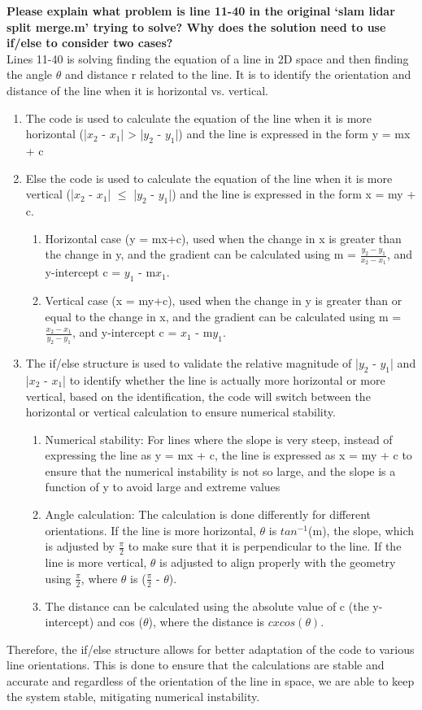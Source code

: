 \textbf{Please explain what problem is line 11-40 in the original ‘slam lidar split merge.m’ trying to solve? Why does the solution need to use if/else to consider two cases?}\\
Lines 11-40 is solving finding the equation of a line in 2D space and then finding the angle $\theta$ and distance r related to the line. It is to identify the orientation and distance of the line when it is horizontal vs. vertical. 
\begin{enumerate}
    \item The code is used to calculate the equation of the line when it is more horizontal (|$x_2$ - $x_1$| > |$y_2$ - $y_1$|) and the line is expressed in the form y = mx + c
    \item Else the code is used to calculate the equation of the line when it is more vertical (|$x_2$ - $x_1$| $\leq$ |$y_2$ - $y_1$|) and the line is expressed in the form x = my + c.
    \begin{enumerate}
        \item Horizontal case (y = mx+c), used when the change in x is greater than the change in y, and the gradient can be calculated using m = $\frac{y_2 - y_1}{x_2 - x_1}$, and y-intercept c = $y_1$ - m$x_1$.
        \item Vertical case (x = my+c), used when the change in y is greater than or equal to the change in x, and the gradient can be calculated using m = $\frac{x_2 - x_1}{y_2 - y_1}$, and y-intercept c = $x_1$ - m$y_1$.
    \end{enumerate}
    \item The if/else structure is used to validate the relative magnitude of |$y_2$ - $y_1$| and |$x_2$ - $x_1$| to identify whether the line is actually more horizontal or more vertical, based on the identification, the code will switch between the horizontal or vertical calculation to ensure numerical stability.
    \begin{enumerate}
        \item Numerical stability: For lines where the slope is very steep, instead of expressing the line as y = mx + c, the line is expressed as x = my + c to ensure that the numerical instability is not so large, and the slope is a function of y to avoid large and extreme values
        \item Angle calculation: The calculation is done differently for different orientations. If the line is more horizontal, $\theta$ is $tan^{-1}$(m), the slope, which is adjusted by $\frac{\pi}{2}$ to make sure that it is perpendicular to the line. If the line is more vertical, $\theta$ is adjusted to align properly with the geometry using $\frac{\pi}{2}$, where $\theta$ is ($\frac{\pi}{2}$ - $\theta$).
        \item The distance can be calculated using the absolute value of c (the y-intercept) and cos ($\theta$), where the distance is $c x cos(\theta)$.
    \end{enumerate}
\end{enumerate}
Therefore, the if/else structure allows for better adaptation of the code to various line orientations. This is done to ensure that the calculations are stable and accurate and regardless of the orientation of the line in space, we are able to keep the system stable, mitigating numerical instability.